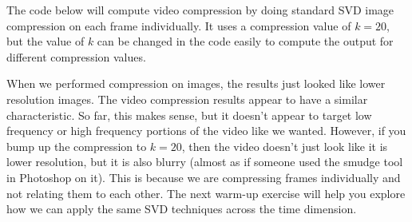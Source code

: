 The code below will compute video compression by doing standard SVD image compression on each frame individually. It uses a compression value of $k = 20$, but the value of $k$ can be changed in the code easily to compute the output for different compression values.


When we performed compression on images, the results just looked like lower resolution images. The video compression results appear to have a similar characteristic. So far, this makes sense, but it doesn't appear to target low frequency or high frequency portions of the video like we wanted. However, if you bump up the compression to $k = 20$, then the video doesn't just look like it is lower resolution, but it is also blurry (almost as if someone used the smudge tool in Photoshop on it). This is because we are compressing frames individually and not relating them to each other. The next warm-up exercise will help you explore how we can apply the same SVD techniques across the time dimension.